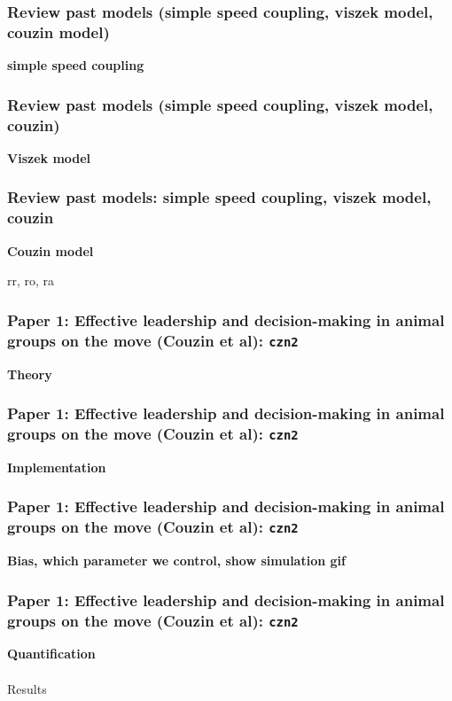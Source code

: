 \documentclass[compress]{beamer}
\begin{document}
\begin{frame}
	\frametitle{Review past models (simple speed coupling, viszek model, couzin model)}
	
\textbf{simple speed coupling}



	
\end{frame}


\begin{frame}
	\frametitle{Review past models (simple speed coupling, viszek model, couzin)}
	
	\textbf{Viszek model}
	
\end{frame}


\begin{frame}
	\frametitle{Review past models: simple speed coupling, viszek model, couzin}
	
	\textbf{Couzin model}
	
	rr, ro, ra
	
\end{frame}


\begin{frame}
  \frametitle{Paper 1: Effective leadership and decision-making in animal groups on the move (Couzin et al): \texttt{czn2}}
 
\textbf{Theory}

\end{frame}


\begin{frame}
	\frametitle{Paper 1: Effective leadership and decision-making in animal groups on the move (Couzin et al): \texttt{czn2}}
	
\textbf{Implementation}
	
\end{frame}


\begin{frame}
	\frametitle{Paper 1: Effective leadership and decision-making in animal groups on the move (Couzin et al): \texttt{czn2}}
	
	\textbf{Bias, which parameter we control, show simulation gif}
	
\end{frame}


\begin{frame}
	\frametitle{Paper 1: Effective leadership and decision-making in animal groups on the move (Couzin et al): \texttt{czn2}}
	
	\textbf{Quantification} \\ \\
	Results
	
\end{frame}
\end{document}
